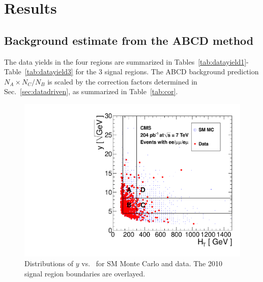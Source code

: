 \section{Results}
\label{sec:results}

\subsection{Background estimate from the ABCD method}
\label{sec:abcdres}

The data yields in the 
four regions are summarized in Tables~\ref{tab:datayield1}-Table~\ref{tab:datayield3}
for the 3 signal regions. The ABCD background prediction $N_A \times N_C / N_B$ is scaled
by the correction factors determined in Sec.~\ref{sec:datadriven}, as summarized in Table~\ref{tab:cor}.

\newpage

\begin{figure}[tbh]
\begin{center}
\includegraphics[width=0.6\linewidth]{plots/abcd_204pb_2010.pdf}
\caption{\label{fig:abcdData1}\protect Distributions of $y$ 
vs. \Ht\ for SM Monte Carlo and data. The 2010 signal region boundaries are overlayed.}
\end{center}
\end{figure}

